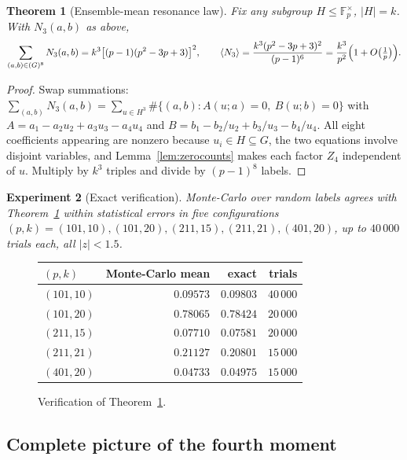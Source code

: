 \documentclass[11pt]{article}
\newtheorem{theorem}{Theorem}
\newtheorem{experiment}[theorem]{Experiment}
\begin{document}
\begin{theorem}[Ensemble-mean resonance law]\label{thm:meanlaw}
Fix any subgroup $H\le\mathbb F_p^\times$, $|H|=k$. With $N_3(a,b)$ as
above,
\[
\sum_{(a,b)\in(G)^8}N_3(a,b)
=k^3\bigl[(p-1)(p^2-3p+3)\bigr]^2,
\qquad
\langle N_3\rangle
=\frac{k^3(p^2-3p+3)^2}{(p-1)^6}
=\frac{k^3}{p^2}\Bigl(1+O\bigl(\tfrac1p\bigr)\Bigr).
\]
\end{theorem}

\begin{proof}
Swap summations:
$\sum_{(a,b)}N_3(a,b)
=\sum_{u\in H^3}\#\{(a,b):A(u;a)=0,\ B(u;b)=0\}$ with
$A=a_1-a_2u_2+a_3u_3-a_4u_4$ and
$B=b_1-b_2/u_2+b_3/u_3-b_4/u_4$. All eight coefficients appearing are
nonzero because $u_i\in H\subseteq G$, the two equations involve
disjoint variables, and Lemma~\ref{lem:zerocounts} makes each factor
$Z_4$ independent of $u$. Multiply by $k^3$ triples and divide by
$(p-1)^8$ labels.
\end{proof}

\begin{experiment}[Exact verification]\label{exp:exactmean}
Monte-Carlo over random labels agrees with Theorem~\ref{thm:meanlaw}
within statistical errors in five configurations
$(p,k)=(101,10),(101,20),(211,15),(211,21),(401,20)$, up to
$40\,000$ trials each, all $|z|<1.5$.
\end{experiment}

\begin{figure}[ht]
\centering
\begin{tabular}{lrrr}
\toprule
$(p,k)$ & Monte-Carlo mean & exact & trials\\
\midrule
$(101,10)$ & $0.09573$ & $0.09803$ & $40\,000$\\
$(101,20)$ & $0.78065$ & $0.78424$ & $20\,000$\\
$(211,15)$ & $0.07710$ & $0.07581$ & $20\,000$\\
$(211,21)$ & $0.21127$ & $0.20801$ & $15\,000$\\
$(401,20)$ & $0.04733$ & $0.04975$ & $15\,000$\\
\bottomrule
\end{tabular}
\caption{Verification of Theorem~\protect\ref{thm:meanlaw}.}
\label{tab:mean}
\end{figure}

\subsection{Complete picture of the fourth moment}
\end{document}
